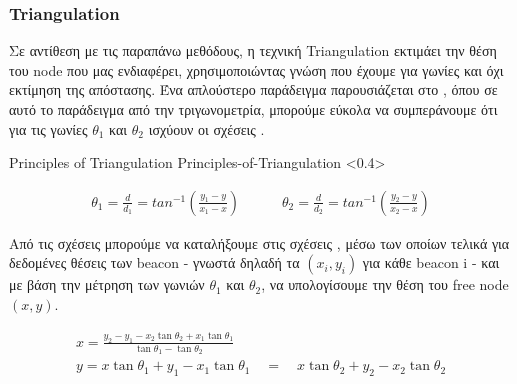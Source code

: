 \subsubsection{Triangulation}
Σε αντίθεση με τις παραπάνω μεθόδους, η τεχνική Triangulation εκτιμάει την θέση του node που μας ενδιαφέρει, χρησιμοποιώντας   
γνώση που έχουμε για γωνίες και όχι εκτίμηση της απόστασης. Ένα απλούστερο παράδειγμα παρουσιάζεται στο , όπου σε αυτό το παράδειγμα από την τριγωνομετρία,
μπορούμε εύκολα να συμπεράνουμε ότι για τις γωνίες $\theta_1$ και $\theta_2$ ισχύουν οι σχέσεις .

%
{Principles of Triangulation}%
{Principles-of-Triangulation}%
<0.4>

\begin{align}
	\theta_1 = \frac{d}{d_1} = tan^{-1}\left(\frac{y_1-y}{x_1-x}\right) \quad \quad \quad
	\theta_2 = \frac{d}{d_2} = tan^{-1}\left(\frac{y_2-y}{x_2-x}\right) \label{eq:angle-equations-triangulation}
\end{align}

Από τις σχέσεις  μπορούμε να καταλήξουμε στις σχέσεις  \cite{triangulation-simple-equation}, μέσω 
των οποίων τελικά για δεδομένες θέσεις των beacon - γνωστά δηλαδή τα $(x_i,y_i)$ για κάθε beacon i - και με βάση την μέτρηση των γωνιών $\theta_1$ και $\theta_2$,
να υπολογίσουμε την θέση του free node $(x,y)$.

\begin{equation}
	\begin{gathered}
		x = \frac{y_2 - y_1-  x_2\tan \theta_2 + x_1\tan \theta_1}{\tan \theta_1 - \tan \theta_2} \\[4pt]
		y = x\tan \theta_1 + y_1 - x_1\tan \theta_1 \quad = \quad x\tan \theta_2 + y_2 - x_2\tan \theta_2    
	\end{gathered}
	\label{eq:triangilation-principle}
\end{equation}

